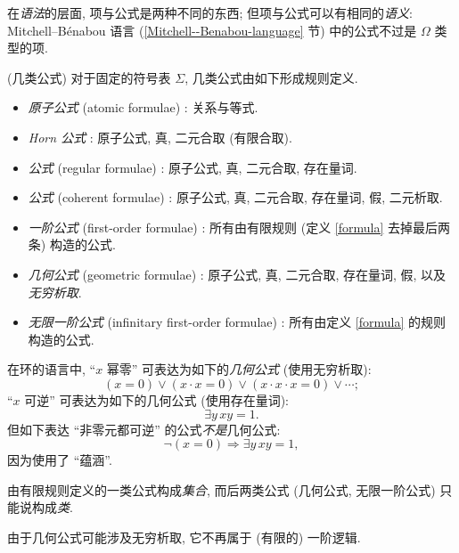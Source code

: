 \begin{remark}
	{}
	在\emph{语法}的层面, 项与公式是两种不同的东西; 但项与公式可以有相同的\emph{语义}: Mitchell--B\'enabou 语言 (\ref{Mitchell--Benabou-language} 节) 中的公式不过是 $\Omega$ 类型的项.
\end{remark}



\begin{definition}
	[label={kinds-of-formulae}]
	{(几类公式)}
	对于固定的符号表 $\Sigma$,
	几类公式由如下形成规则定义.
	\begin{itemize}
		\item \emph{原子公式} (atomic formulae) : 关系与等式.
		\item \emph{Horn 公式}\footnotemark{} : 原子公式, 真, 二元合取 (有限合取).
		\item \emph{\regular{}公式} (regular formulae) : 原子公式, 真, 二元合取, 存在量词.
		\item \emph{\coherent{}公式} (coherent formulae) : 原子公式, 真, 二元合取, 存在量词, 假, 二元析取.
		\item \emph{一阶公式} (first-order formulae) : 所有由有限规则 (定义 \ref{formula} 去掉最后两条) 构造的公式.
		\item \emph{几何公式} (geometric formulae) : 原子公式, 真, 二元合取, 存在量词, 假, 以及\emph{无穷析取}.
		\item \emph{无限一阶公式} (infinitary first-order formulae) : 所有由定义 \ref{formula} 的规则构造的公式.
	\end{itemize}
\end{definition}

\begin{example}
	{}
	在环的语言中, ``$x$ 幂零'' 可表达为如下的\emph{几何公式} (使用无穷析取):
	$$
	(x=0)\lor (x\cdot x=0) \lor (x\cdot x\cdot x=0)\lor\cdots;
	$$
	``$x$ 可逆'' 可表达为如下的几何公式 (使用存在量词):
	$$
	\exists y\, xy= 1.
	$$
	但如下表达 ``非零元都可逆'' 的公式\emph{不是}几何公式:
	$$
	\neg(x=0) \Rightarrow \exists y\,xy=1,
	$$
	因为使用了 ``蕴涵''.
\end{example}

\begin{remark}
	{}
	由有限规则定义的一类公式构成\emph{集合}, 而后两类公式 (几何公式, 无限一阶公式) 只能说构成\emph{类}.
	
	由于几何公式可能涉及无穷析取, 它不再属于 (有限的) 一阶逻辑.
\end{remark}

